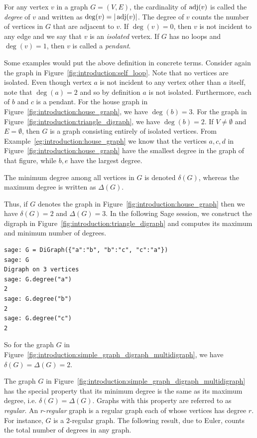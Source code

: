 \begin{definition}
\rm
For any vertex $v$ in a graph $G = (V, E)$, the
cardinality of $\operatorname*{adj}(v)$ is called the
\emph{degree} of $v$ and written as
$\deg(v) = |\operatorname*{adj}(v)|$\index{$\deg$}. The degree of $v$ counts the
number of vertices in $G$ that are adjacent to $v$. If $\deg(v) = 0$,
then $v$ is not incident to any edge and we say that $v$ is an
\emph{isolated} vertex. If $G$ has no loops
and $\deg(v) = 1$, then $v$ is called a
\emph{pendant}.
\end{definition}

Some examples would put the above definition in concrete
terms. Consider again the graph in
Figure~\ref{fig:introduction:self_loop}. Note that no vertices are
isolated. Even though vertex $a$ is not incident to any vertex other
than $a$ itself, note that $\deg(a) = 2$ and so by definition $a$ is
not isolated. Furthermore, each of $b$ and $c$ is a pendant. For the
house graph in Figure~\ref{fig:introduction:house_graph}, we have
$\deg(b) = 3$. For the graph in
Figure~\ref{fig:introduction:triangle_digraph}, we have
$\deg(b) = 2$. If $V \neq \emptyset$ and $E = \emptyset$, then
$G$ is a graph consisting entirely of isolated vertices. From
Example~\ref{eg:introduction:house_graph} we know that the vertices
$a, c, d$ in Figure~\ref{fig:introduction:house_graph} have the
smallest degree in the graph of that figure, while $b, e$ have the
largest degree.

The minimum degree among
all vertices in $G$ is denoted $\delta(G)$, whereas
the maximum degree is written as
$\Delta(G)$.

Thus, if $G$ denotes the graph in
Figure~\ref{fig:introduction:house_graph} then we have $\delta(G) = 2$
and $\Delta(G) = 3$. In the following Sage session, we construct the
digraph in Figure~\ref{fig:introduction:triangle_digraph} and computes
its maximum and minimum number of degrees.
\begin{lstlisting}
sage: G = DiGraph({"a":"b", "b":"c", "c":"a"})
sage: G
Digraph on 3 vertices
sage: G.degree("a")
2
sage: G.degree("b")
2
sage: G.degree("c")
2
\end{lstlisting}
So for the graph $G$ in
Figure~\ref{fig:introduction:simple_graph_digraph_multidigraph}, we have
$\delta(G) = \Delta(G) = 2$.

The graph $G$ in
Figure~\ref{fig:introduction:simple_graph_digraph_multidigraph}
has the special property that its minimum degree is the same as its
maximum degree, i.e. $\delta(G) = \Delta(G)$. Graphs with this
property are referred to as
\emph{regular}. An
$r$-\emph{regular}
graph is a regular graph each of whose vertices has degree $r$. For
instance, $G$ is a $2$-regular graph. The following result, due to
Euler, counts the total number of degrees in any graph.


